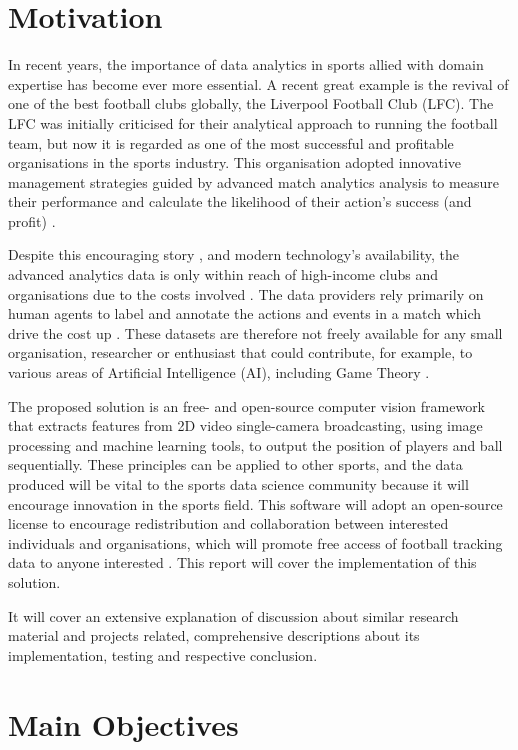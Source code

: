 \documentclass[
    11pt,
    twoside
]{report}
\begin{document}
\section{Motivation}


In recent years, the importance of data analytics in sports allied with domain expertise has become ever more essential. A recent great example is the revival of one of the best football clubs globally, the Liverpool Football Club (LFC). The LFC was initially criticised for their analytical approach to running the football team, but now it is regarded as one of the most successful and profitable organisations in the sports industry. This organisation adopted innovative management strategies guided by advanced match analytics analysis to measure their performance and calculate the likelihood of their action's success (and profit) \cite{liverpool}.


Despite this encouraging story \cite{liverpool}, and modern technology's availability, the advanced analytics data is only within reach of high-income clubs and organisations due to the costs involved \cite{opta}. The data providers rely primarily on human agents to label and annotate the actions and events in a match which drive the cost up \cite{opta}. These datasets are therefore not freely available for any small organisation, researcher or enthusiast that could contribute, for example, to various areas of Artificial Intelligence (AI), including Game Theory \cite{deepmind}.


The proposed solution is an free- and open-source computer vision framework that extracts features from 2D video single-camera broadcasting, using image processing and machine learning tools, to output the position of players and ball sequentially. These principles can be applied to other sports, and the data produced will be vital to the sports data science community because it will encourage innovation in the sports field. This software will adopt an open-source license to encourage redistribution and collaboration between interested individuals and organisations, which will promote free access of football tracking data to anyone interested \cite{osd}.  This report will cover the implementation of this solution.


It will cover an extensive explanation of  discussion about similar research material and projects related, comprehensive descriptions about its implementation, testing and respective conclusion.



\section{Main Objectives}
\end{document}
